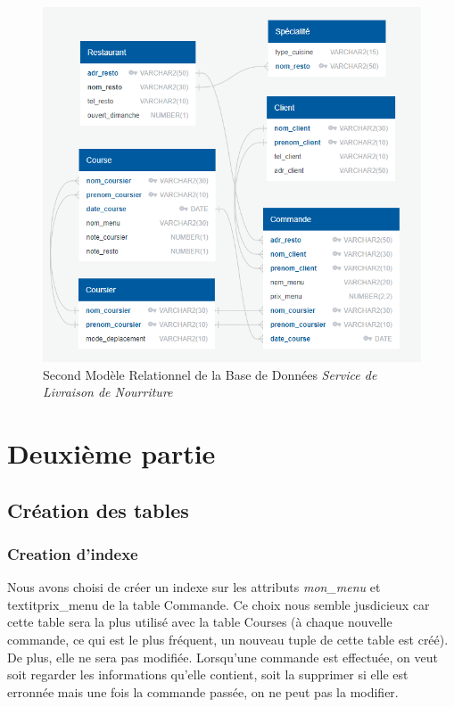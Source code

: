 \documentclass[french]{article}
\begin{document}
        \begin{figure}[ht] %
            \centering
            \includegraphics[scale = 0.7]{Image/modele_relationnel_2.png}
            \caption{Second Modèle Relationnel de la Base de Données \emph{Service de Livraison de Nourriture}}
            \label{image_modele_relationnel_2}
        \end{figure}
        \newpage

    \section{Deuxième partie}
        \subsection*{Création des tables}


        \subsubsection*{Creation d'indexe}
        Nous avons choisi de créer un indexe sur les attributs \textit{mon\_menu} et textit{prix\_menu} de la table Commande. Ce choix nous semble jusdicieux car cette table sera la plus utilisé avec la table Courses (à chaque nouvelle commande, ce qui est le plus fréquent, un nouveau tuple de cette table est créé). De plus, elle ne sera pas modifiée. Lorsqu'une commande est effectuée, on veut soit regarder les informations qu'elle contient, soit la supprimer si elle est erronnée mais une fois la commande passée, on ne peut pas la modifier. 
            
\end{document}
